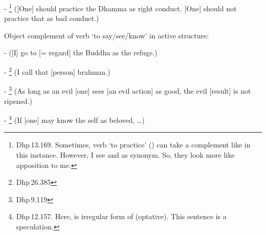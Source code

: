 \begin{compactenum}[(1)]
- \footnote{Dhp\,13.169. Sometimes, verb `to practice' () can take a complement like in this instance. However, I see  and  as synonym. So, they look more like apposition to me.} ([One] should practice the Dhamma as right conduct. [One] should not practice that as bad conduct.)\par
\item Object complement of verb `to say/see/know' in active structure:\par
-  ([I] go to [= regard] the Buddha as the refuge.)\par
- \footnote{Dhp\,26.385} (I call that [person] brahman.)\par
- \footnote{Dhp\,9.119} (As long as an evil [one] sees [an evil action] as good, the evil [result] is not ripened.)\par
- \footnote{Dhp\,12.157. Here,  is irregular form of  (optative). This sentence is a speculation.} (If [one] may know the self as beloved, \ldots)\par
\end{compactenum}

